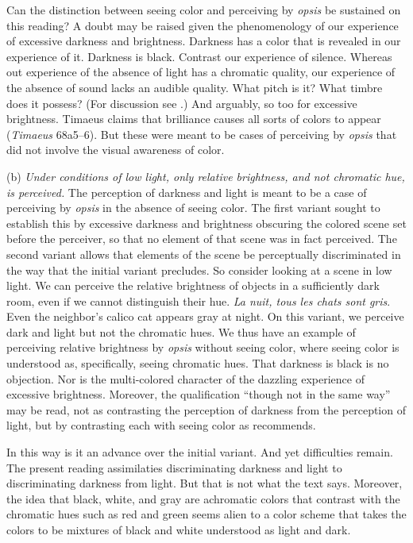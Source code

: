 Can the distinction between seeing color and perceiving by \emph{opsis} be sustained on this reading? A doubt may be raised given the phenomenology of our experience of excessive darkness and brightness. Darkness has a color that is revealed in our experience of it. Darkness is black. Contrast our experience of silence. Whereas out experience of the absence of light has a chromatic quality, our experience of the absence of sound lacks an audible quality. What pitch is it? What timbre does it possess? (For discussion see \citealt{Sorensen:2008kx,Sorensen:2009aa}.) And arguably, so too for excessive brightness. Timaeus claims that brilliance causes all sorts of colors to appear (\emph{Timaeus} 68a5–6). But these were meant to be cases of perceiving by \emph{opsis} that did not involve the visual awareness of color.

(b) \emph{Under conditions of low light, only relative brightness, and not chromatic hue, is perceived.} The perception of darkness and light is meant to be a case of perceiving by \emph{opsis} in the absence of seeing color. The first variant sought to establish this by excessive darkness and brightness obscuring the colored scene set before the perceiver, so that no element of that scene was in fact perceived. The second variant allows that elements of the scene be perceptually discriminated in the way that the initial variant precludes. So consider looking at a scene in low light. We can perceive the relative brightness of objects in a sufficiently dark room, even if we cannot distinguish their hue. \emph{La nuit, tous les chats sont gris}. Even the neighbor's calico cat appears gray at night. On this variant, we perceive dark and light but not the chromatic hues. We thus have an example of perceiving relative brightness by \emph{opsis} without seeing color, where seeing color is understood as, specifically, seeing chromatic hues. That darkness is black is no objection. Nor is the multi-colored character of the dazzling experience of excessive brightness. Moreover, the qualification ``though not in the same way'' may be read, not as contrasting the perception of darkness from the perception of light, but by contrasting each with seeing color as \citet[275]{Ross:1961uq} recommends.

In this way is it an advance over the initial variant. And yet difficulties remain. The present reading assimilaties discriminating darkness and light to discriminating darkness from light. But that is not what the text says. Moreover, the idea that black, white, and gray are achromatic colors that contrast with the chromatic hues such as red and green seems alien to a color scheme that takes the colors to be mixtures of black and white understood as light and dark.

